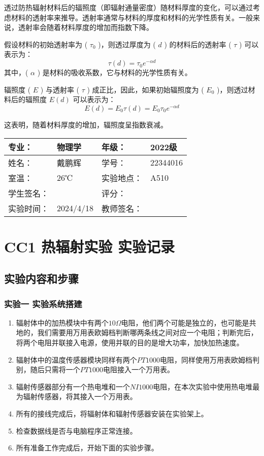 \documentclass[dvipsnames, svgnames,a4paper,11pt]{article}
\begin{document}
	透过防热辐射材料后的辐照度（即辐射通量密度）随材料厚度的变化，可以通过考虑材料的透射率来推导。透射率通常与材料的厚度和材料的光学性质有关。一般来说，透射率会随着材料厚度的增加而指数下降。
	
	假设材料的初始透射率为 ( $\tau_0$ )，则透过厚度为 ( $d$ ) 的材料后的透射率 ( $\tau$ ) 可以表示为：
	\[
		\tau(d)=\tau_0e^{-\alpha d}
	\]
	其中，( $\alpha$ ) 是材料的吸收系数，它与材料的光学性质有关。
	
	辐照度 ( $E$ ) 与透射率 ( $\tau$ ) 成正比，因此，如果初始辐照度为 ( $E_0$ )，则透过材料后的辐照度  $E(d)$  可以表示为：
	\[
		E(d)=E_0\tau(d)=E_0\tau_0 e^{-\alpha d}
	\]
	
	这表明，随着材料厚度的增加，辐照度呈指数衰减。






\clearpage
\begin{table}
	\renewcommand\arraystretch{1.7}
	\centering
	\begin{tabularx}{\textwidth}{|X|X|X|X|}
	\hline
	专业：& 物理学 &年级：& 2022级 \\
	\hline
	姓名：& 戴鹏辉 & 学号：& 22344016 \\
	\hline
	室温：& 26℃ & 实验地点： & A510 \\
	\hline
	学生签名：& & 评分： &\\
	\hline
	实验时间：& 2024/4/18 & 教师签名：&\\
	\hline
	\end{tabularx}
\end{table}

\section{CC1 \quad 热辐射实验 \quad\heiti 实验记录}
\subsection{实验内容和步骤}

\subsubsection{实验一 \quad 实验系统搭建}

	
	\begin{enumerate}
		\item 辐射体中的加热模块中有两个$10\Omega$电阻，他们两个可能是独立的，也可能是共地的，我们需要用万用表欧姆档判断哪两条线之间对应一个电阻；判断完后，将两个电阻并联接入电源，使用并联的目的是增大功率，加快加热速度。
		\item 辐射体中的温度传感器模块同样有两个$PT1000$电阻，同样使用万用表欧姆档判别，随后只需将一个$PT1000$电阻接入一个万用表。
		\item 辐射传感器部分有一个热电堆和一个$NI1000$电阻，在本次实验中使用热电堆最为辐射传感器，将其接入一个万用表。
		\item 所有的接线完成后，将辐射体和辐射传感器安装在实验架上。
		\item 检查数据线是否与电脑程序正常连接。
		\item 所有准备工作完成后，开始下面的实验步骤。
	\end{enumerate}
\end{document}
